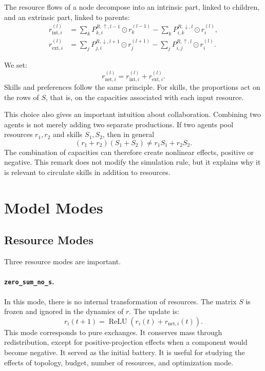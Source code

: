 \documentclass[11pt]{article}
\begin{document}
The resource flows of a node decompose into an intrinsic part, linked to children, and an extrinsic part, linked to parents:
\begin{align}
    r_{\mathrm{int},i}^{(l)} &=
    \sum_k P^{R,\uparrow,l-1}_{k,i} \odot r_k^{(l-1)}
    -
    \sum_k P^{R,\downarrow,l}_{i,k} \odot r_i^{(l)}, \\
    r_{\mathrm{ext},i}^{(l)} &=
    \sum_j P^{R,\downarrow,l+1}_{j,i} \odot r_j^{(l+1)}
    -
    \sum_j P^{R,\uparrow,l}_{i,j} \odot r_i^{(l)}.
\end{align}

We set:
\begin{equation}
    r_{\mathrm{net},i}^{(l)} = r_{\mathrm{int},i}^{(l)} + r_{\mathrm{ext},i}^{(l)}.
\end{equation}
Skills and preferences follow the same principle. For skills, the proportions act on the rows of $S$, that is, on the capacities associated with each input resource.

This choice also gives an important intuition about collaboration. Combining two agents is not merely adding two separate productions. If two agents pool resources $r_1,r_2$ and skills $S_1,S_2$, then in general
\begin{equation}
    (r_1+r_2)(S_1+S_2) \neq r_1S_1+r_2S_2.
\end{equation}
The combination of capacities can therefore create nonlinear effects, positive or negative. This remark does not modify the simulation rule, but it explains why it is relevant to circulate skills in addition to resources.

\section{Model Modes}

\subsection{Resource Modes}

Three resource modes are important.

\paragraph{\texttt{zero\_sum\_no\_s}.}
In this mode, there is no internal transformation of resources. The matrix $S$ is frozen and ignored in the dynamics of $r$. The update is:
\begin{equation}
    r_i(t+1) = \operatorname{ReLU}\left(r_i(t) + r_{\mathrm{net},i}(t)\right).
\end{equation}
This mode corresponds to pure exchanges. It conserves mass through redistribution, except for positive-projection effects when a component would become negative. It served as the initial battery. It is useful for studying the effects of topology, budget, number of resources, and optimization mode.
\end{document}
